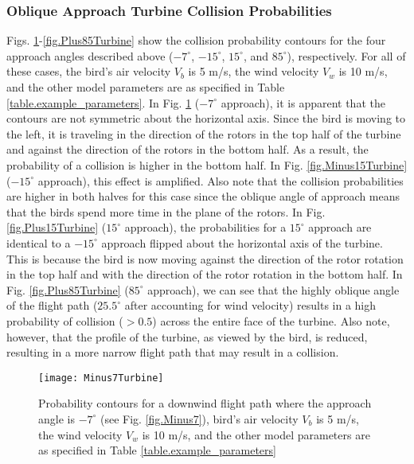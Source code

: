 \documentclass[10pt,conference]{IEEEtran}
\begin{document}
\subsubsection{Oblique Approach Turbine Collision Probabilities}
Figs. \ref{fig.Minus7Turbine}-\ref{fig.Plus85Turbine} show the collision probability contours for the four approach
angles described above ($-7^\circ$, $-15^\circ$, $15^\circ$, and $85^\circ$), respectively. For all of these cases, the
bird's air velocity $V_b$ is 5 m/s, the wind velocity $V_w$ is 10 m/s, and the other model parameters are as specified
in Table \ref{table.example_parameters}. In Fig. \ref{fig.Minus7Turbine} ($-7^\circ$ approach), it is apparent that the
contours are not symmetric about the horizontal axis. Since the bird is moving to the left, it is traveling in the
direction of the rotors in the top half of the turbine and against the direction of the rotors in the bottom half. As a
result, the probability of a collision is higher in the bottom half. In Fig. \ref{fig.Minus15Turbine} ($-15^\circ$
approach), this effect is amplified. Also note that the collision probabilities are higher in both halves for this case
since the oblique angle of approach means that the birds spend more time in the plane of the rotors. In Fig.
\ref{fig.Plus15Turbine} ($15^\circ$ approach), the probabilities for a $15^\circ$ approach are identical to a
$-15^\circ$ approach flipped about the horizontal axis of the turbine. This is because the bird is now moving against
the direction of the rotor rotation in the top half and with the direction of the rotor rotation in the bottom half. In
Fig. \ref{fig.Plus85Turbine} ($85^\circ$ approach), we can see that the highly oblique angle of the flight path
($25.5^\circ$ after accounting for wind velocity) results in a high probability of collision ($>0.5$) across the entire
face of the turbine. Also note, however, that the profile of the turbine, as viewed by the bird, is reduced, resulting
in a more narrow flight path that may result in a collision.

\begin{figure}
   \centering
   \texttt{[image: Minus7Turbine]}
   \caption{Probability contours for a downwind flight path where the approach angle is $-7^\circ$ (see Fig. \ref{fig.Minus7}), bird's air velocity $V_b$ is 5
m/s, the wind velocity $V_w$ is 10 m/s, and the other model parameters are as specified in Table
\ref{table.example_parameters}}
   \label{fig.Minus7Turbine}
   \end{figure}
\end{document}

